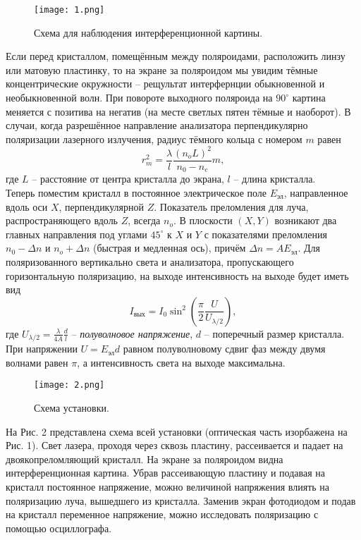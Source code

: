 \begin{figure}[H]
	\begin{center}
		\texttt{[image: 1.png]}
	\end{center}
	\caption{Схема для наблюдения интерференционной картины.}
\end{figure}
Если перед кристаллом, помещённым между поляроидами, расположить линзу или матовую пластинку, то на экране за поляроидом мы увидим тёмные концентрические окружности -- рещультат интерфернции обыкновенной и необыкновенной волн. При повороте выходного поляроида на $90^\circ$ картина меняется с позитива на негатив (на месте светлых пятен тёмные и наоборот). В случаи, когда разрешённое направление анализатора перпендикулярно поляризации лазерного излучения, радиус тёмного кольца с номером $m$ равен
\begin{equation}
r_m^2 = \dfrac{\lambda}{l} \dfrac{(n_oL)^2}{n_0 - n_e}m,
\end{equation}
где $L$ -- расстояние от центра кристалла до экрана, $l$ -- длина кристалла.\\
Теперь поместим кристалл в постоянное электрическое поле $E_{\text{эл}}$, направленное вдоль оси $X$, перпендикулярной $Z$. Показатель преломления для луча, распространяющего вдоль $Z$, всегда $n_o$. В плоскости $(X,Y)$ возникают два главных направления под углами $45^\circ$ к $X$ и $Y$ с показателями преломления $n_0 - \Delta n$ и $n_o + \Delta n$ (быстрая и медленная ось), причём $\Delta n = A E_{\text{эл}}$. Для поляризованного вертикально света и анализатора, пропускающего горизонтальную поляризацию, на выходе интенсивность на выходе будет иметь вид
\begin{equation}
I_{\text{вых}} = I_0 \sin^2 \left(\dfrac{\pi}{2} \dfrac{U}{U_{\lambda/2}} \right),
\end{equation}
где $U_{\lambda/2} = \frac{\lambda}{4A}\frac{d}{l}$ -- \textit{полуволновое напряжение}, $d$ -- поперечный размер кристалла.  При напряжении $U = E_{\text{эл}}d$ равном полуволновому сдвиг фаз между двумя волнами равен $\pi$, а интенсивность света на выходе максимальна. 


\begin{figure}[H]
	\begin{center}
		\texttt{[image: 2.png]}
	\end{center}
	\caption{Схема установки.}
\end{figure}
На Рис. 2 представлена схема всей установки (оптическая часть изорбажена на Рис. 1). Свет лазера, проходя через сквозь пластину, рассеивается и падает на двоякопреломляющий кристалл. На экране за поляроидом видна интерференционная картина. Убрав рассеивающую пластину и подавая на кристалл постоянное напряжение, можно величиной напряжения влиять на поляризацию луча, вышедшего из кристалла. Заменив экран фотодиодом и подав на кристалл переменное напряжение, можно исследовать поляризацию с помощью осциллографа.

